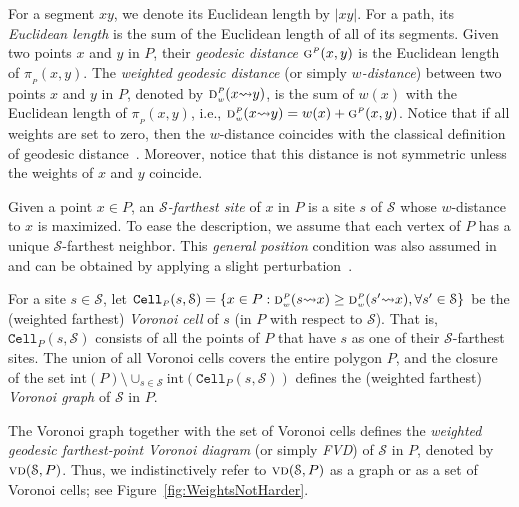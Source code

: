 \documentclass[a4paper,UKenglish]{socg-lipics-v2018}
\newcommand{\s}{\mathcal S}
\newcommand{\g}[3][P]{\ensuremath{\textsc{g}^{\scriptscriptstyle #1}(#2, #3)}}
\newcommand{\dd}[3][P]{\ensuremath{\textsc{d}_{\scriptscriptstyle w}^{\scriptscriptstyle #1}(#2 {\leadsto} #3)}}
\newcommand{\p}[3][P]{\ensuremath{\pi_{_{#1}}(#2, #3)}}
\newcommand{\cell}[2][P]{\ensuremath{\mathtt{Cell}_{\scriptscriptstyle #1}(#2)}}
\newcommand{\interior}[1]{\mathrm{int}(#1)}
\newcommand{\vd}[2][P]{\textsc{vd}(#2, #1)}
\begin{document}
For a segment $xy$, we denote its Euclidean length by $|xy|$. For a path, its \emph{Euclidean length} is the sum of the Euclidean length of all of its segments. Given two points $x$ and $y$ in $P$, their \emph{geodesic distance} $\g{x}{y}$ is the Euclidean length of $\p{x}{y}$.
The \emph{weighted geodesic distance} (or simply \emph{$w$-distance}) between two points $x$ and $y$ in $P$, denoted by $\dd{x}{y}$, is the sum of $w(x)$ with the Euclidean length of $\p{x}{y}$, i.e., $\dd{x}{y} = w(x) + \g{x}{y}$. Notice that if all weights are set to zero, then the $w$-distance coincides with the classical definition of geodesic distance~\cite{m-gspno-00}. 
Moreover, notice that this distance is not symmetric unless the weights of $x$ and $y$ coincide. 

Given a point $x\in P$, an \emph{$\s$-farthest site} of $x$ in $P$ is a site  $s$ of  $\s$ whose $w$-distance to $x$ is maximized.
To ease the description, we assume that each vertex of $P$ has a unique $\s$-farthest neighbor. 
This \emph{general position} condition was also assumed in~\cite{ahn2015linear,aronov1993furthest,oh2016farthest} and can be obtained by applying a slight perturbation~\cite{edelsbrunner1990simulation}.

For a site $s\in \s$, let $\cell{s,\s} = \{x\in P: \dd{s}{x} \geq \dd{s'}{x}, \forall s'\in \s\}$ be the (weighted farthest) \emph{Voronoi cell} of $s$ (in $P$ with respect to $\s$). 
That is, $\cell{s,\s}$ consists of all the points of $P$ that have $s$ as one of their $\s$-farthest sites.
The union of all Voronoi cells covers the entire polygon $P$, and the closure of the set $\interior{P} \setminus \cup_{s \in \s} \interior{\cell{s,\s}}$ defines the (weighted farthest) \emph{Voronoi graph} of $\s$ in $P$. 

The Voronoi graph together with the set of Voronoi cells defines the \emph{weighted geodesic farthest-point
Voronoi diagram} (or simply \emph{FVD}) of $\s$ in $P$, denoted by $\vd{\s}$.
Thus, we indistinctively refer to $\vd{\s}$ as a graph or as a set of Voronoi cells; see Figure~\ref{fig:WeightsNotHarder}.
\end{document}
